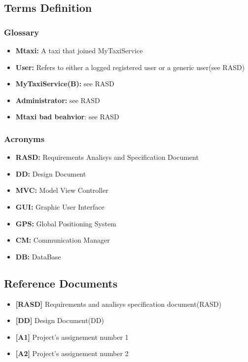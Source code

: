 \documentclass[11pt,titlepage]{article} %
\begin{document}
\subsection{Terms Definition}
  \subsubsection{Glossary}
    \begin{itemize}
      \item \textbf{Mtaxi:} A taxi that joined MyTaxiService
      \item \textbf{User:} Refers to either a logged registered user or a generic user(see RASD)
      \item \textbf{MyTaxiService(B):} see RASD
      \item \textbf{Administrator:} see RASD
      \item \textbf{Mtaxi bad beahvior}: see RASD
    \end{itemize}
   
  \subsubsection{Acronyms}
    \begin{itemize}
      \item \textbf{RASD:} Requirements Analisys and Specification Document
      \item \textbf{DD:} Design Document
      \item \textbf{MVC:} Model View Controller
      \item \textbf{GUI:} Graphic User Interface
      \item \textbf{GPS:} Global Positioning System
      \item \textbf{CM:} Communication Manager
      \item \textbf{DB:} DataBase
     \end{itemize}

\subsection{Reference Documents}
  \begin{itemize}
   \item \textbf{[RASD]} Requirements and analisys specification document(RASD)
   \item \textbf{[DD]} Design Document(DD)
   \item \textbf{[A1]} Project's assignement number 1
   \item \textbf{[A2]} Project's assignement number 2
  \end{itemize}
\end{document}
